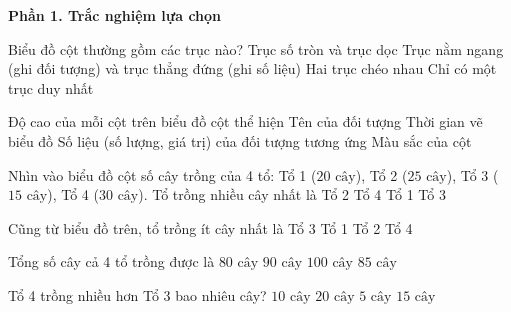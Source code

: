 \textbf{Phần 1. Trắc nghiệm lựa chọn}

\begin{ex} %
Biểu đồ cột thường gồm các trục nào?
\choice
{Trục số tròn và trục dọc}
{\True Trục nằm ngang (ghi đối tượng) và trục thẳng đứng (ghi số liệu)}
{Hai trục chéo nhau}
{Chỉ có một trục duy nhất}
\end{ex}

\begin{ex} %
Độ cao của mỗi cột trên biểu đồ cột thể hiện
\choice
{Tên của đối tượng}
{Thời gian vẽ biểu đồ}
{\True Số liệu (số lượng, giá trị) của đối tượng tương ứng}
{Màu sắc của cột}
\end{ex}

\begin{ex} %
Nhìn vào biểu đồ cột số cây trồng của 4 tổ: Tổ 1 ($20\text{ cây}$), Tổ 2 ($25\text{ cây}$), Tổ 3 ($15\text{ cây}$), Tổ 4 ($30\text{ cây}$). Tổ trồng nhiều cây nhất là
\choice
{Tổ 2}
{\True Tổ 4}
{Tổ 1}
{Tổ 3}
\end{ex}

\begin{ex} %
Cũng từ biểu đồ trên, tổ trồng ít cây nhất là
\choice
{\True Tổ 3}
{Tổ 1}
{Tổ 2}
{Tổ 4}
\end{ex}

\begin{ex} %
Tổng số cây cả 4 tổ trồng được là
\choice
{$80\text{ cây}$}
{\True $90\text{ cây}$}
{$100\text{ cây}$}
{$85\text{ cây}$}
\end{ex}

\begin{ex} %
Tổ 4 trồng nhiều hơn Tổ 3 bao nhiêu cây?
\choice
{$10\text{ cây}$}
{$20\text{ cây}$}
{$5\text{ cây}$}
{\True $15\text{ cây}$}
\end{ex}

